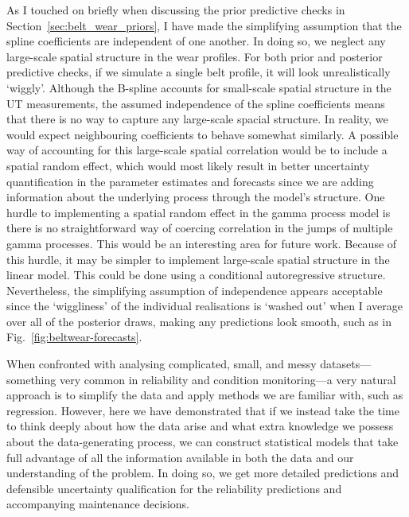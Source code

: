 As I touched on briefly when discussing the prior predictive checks in Section~\ref{sec:belt_wear_priors}, I have made the simplifying assumption that the spline coefficients are independent of one another. In doing so, we neglect any large-scale spatial structure in the wear profiles. For both prior and posterior predictive checks, if we simulate a single belt profile, it will look unrealistically `wiggly'. Although the B-spline accounts for small-scale spatial structure in the UT measurements, the assumed independence of the spline coefficients means that there is no way to capture any large-scale spacial structure. In reality, we would expect neighbouring coefficients to behave somewhat similarly. A possible way of accounting for this large-scale spatial correlation would be to include a spatial random effect, which would most likely result in better uncertainty quantification in the parameter estimates and forecasts since we are adding information about the underlying process through the model's structure. One hurdle to implementing a spatial random effect in the gamma process model is there is no straightforward way of coercing correlation in the jumps of multiple gamma processes. This would be an interesting area for future work. Because of this hurdle, it may be simpler to implement large-scale spatial structure in the linear model. This could be done using a conditional autoregressive structure. Nevertheless, the simplifying assumption of independence appears acceptable since the `wiggliness' of the individual realisations is `washed out' when I average over all of the posterior draws, making any predictions look smooth, such as in Fig.~\ref{fig:beltwear-forecasts}.

When confronted with analysing complicated, small, and messy datasets---something very common in reliability and condition monitoring---a very natural approach is to simplify the data and apply methods we are familiar with, such as regression. However, here we have demonstrated that if we instead take the time to think deeply about how the data arise and what extra knowledge we possess about the data-generating process, we can construct statistical models that take full advantage of all the information available in both the data and our understanding of the problem. In doing so, we get more detailed predictions and defensible uncertainty qualification for the reliability predictions and accompanying maintenance decisions.
